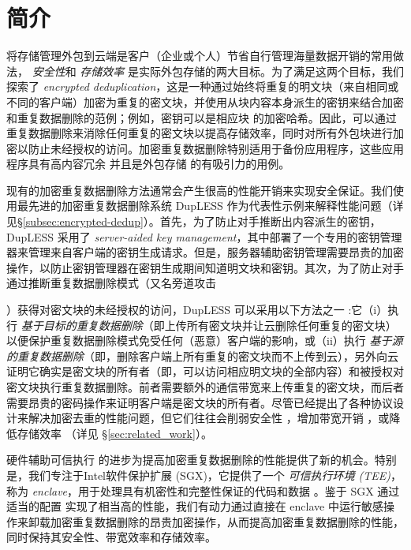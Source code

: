 \section{简介}
\label{sec:introduction}

将存储管理外包到云端是客户（企业或个人）节省自行管理海量数据开销的常用做法，\textit{ 安全性}和\textit{ 存储效率} 是实际外包存储的两大目标。为了满足这两个目标，我们探索了 \textit{ encrypted deduplication}，这是一种通过始终将重复的明文块（来自相同或不同的客户端）加密为重复的密文块，并使用从块内容本身派生的密钥来结合加密和重复数据删除的范例；例如，密钥可以是相应块 \cite{douceur02} 的加密哈希。因此，可以通过重复数据删除来消除任何重复的密文块以提高存储效率，同时对所有外包块进行加密以防止未经授权的访问。加密重复数据删除特别适用于备份应用程序，这些应用程序具有高内容冗余 \cite{wallace12} 并且是外包存储 \cite{hasan05,kotla07,varble09} 的有吸引力的用例。

现有的加密重复数据删除方法通常会产生很高的性能开销来实现安全保证。我们使用最先进的加密重复数据删除系统 DupLESS \cite{bellare13b} 作为代表性示例来解释性能问题（详见\S\ref{subsec:encrypted-dedup}）。首先，为了防止对手推断出内容派生的密钥，DupLESS 采用了 \textit{ server-aided key management}，其中部署了一个专用的密钥管理器来管理来自客户端的密钥生成请求。但是，服务器辅助密钥管理需要昂贵的加密操作，以防止密钥管理器在密钥生成期间知道明文块和密钥。其次，为了防止对手通过推断重复数据删除模式（又名旁道攻击

\cite{harnik2010side, halevi2011proofs}）获得对密文块的未经授权的访问，DupLESS 可以采用以下方法之一 :它（i）执行 \textit{ 基于目标的重复数据删除}（即上传所有密文块并让云删除任何重复的密文块）以便保护重复数据删除模式免受任何（恶意）客户端的影响，或（ii）执行\textit{ 基于源的重复数据删除}（即，删除客户端上所有重复的密文块而不上传到云），另外向云证明它确实是密文块的所有者（即，可以访问相应明文块的全部内容）和被授权对密文块执行重复数据删除。前者需要额外的通信带宽来上传重复的密文块，而后者需要昂贵的密码操作来证明客户端是密文块的所有者。尽管已经提出了各种协议设计来解决加密去重的性能问题，但它们往往会削弱安全性 \cite{li20b,xu13,pietro12}，增加带宽开销 \cite{harnik10,li15}，或降低存储效率 \cite{zhou15, qin17,li20b}（详见 \S\ref{sec:related_work}）。
  
硬件辅助可信执行 \cite{trustzone,sgx,Mktem,Amdsev} 的进步为提高加密重复数据删除的性能提供了新的机会。特别是，我们专注于Intel软件保护扩展 (SGX)，它提供了一个 \textit{ 可信执行环境 (TEE)}，称为 \textit{ enclave}，用于处理具有机密性和完整性保证的代码和数据 \cite{baumann14 }。鉴于 SGX 通过适当的配置 \cite{harnik18} 实现了相当高的性能，我们有动力通过直接在 enclave 中运行敏感操作来卸载加密重复数据删除的昂贵加密操作，从而提高加密重复数据删除的性能，同时保持其安全性、带宽效率和存储效率。

